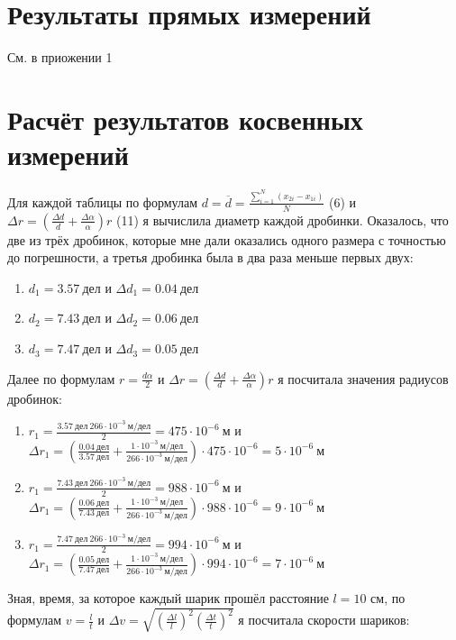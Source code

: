 \documentclass[a4paper]{article}
\begin{document}
\section{Результаты прямых измерений}
См. в приожении 1

\section{Расчёт результатов косвенных измерений}
Для каждой таблицы по формулам $d = \overline{d} = \frac{\sum_{i=1}^N (x_{2i} - x_{1i})}{N}$ (6) и $\Delta r = (\frac{\Delta d}{d} + \frac{\Delta \alpha}{\alpha})r$ (11) я вычислила диаметр каждой дробинки. Оказалось, что две из трёх дробинок, которые мне дали оказались одного размера с точностью до погрешности, а третья дробинка была в два раза меньше первых двух:

\begin{enumerate}
    \item $d_1 = 3.57 \ дел$ и $\Delta d_1 = 0.04 \ дел$ 
    \item $d_2 = 7.43 \ дел$ и $\Delta d_2 = 0.06 \ дел$
    \item $d_3 = 7.47 \ дел$ и $\Delta d_3 = 0.05 \ дел$
\end{enumerate}

Далее по формулам $r = \frac{d \alpha}{2}$ и $\Delta r = (\frac{\Delta d}{d} + \frac{\Delta \alpha}{\alpha})r$ я посчитала значения радиусов дробинок:

\begin{enumerate}
    \item $r_1 = \frac{3.57 \ дел \ 266 \cdot 10^{-3} \ м/дел}{2} = 475 \cdot 10^{-6} \ м$ и $\Delta r_1 = (\frac{0.04 \ дел}{3.57 \ дел} + \frac{1 \cdot 10^{-3} \ м/дел}{266 \cdot 10^{-3} \ м/дел}) \cdot 475 \cdot 10^{-6} = 5 \cdot 10^{-6} \ м$
    \item $r_1 = \frac{7.43 \ дел \ 266 \cdot 10^{-3} \ м/дел}{2} = 988 \cdot 10^{-6} \ м$ и $\Delta r_1 = (\frac{0.06 \ дел}{7.43 \ дел} + \frac{1 \cdot 10^{-3} \ м/дел}{266 \cdot 10^{-3} \ м/дел}) \cdot 988 \cdot 10^{-6} = 9 \cdot 10^{-6} \ м$
    
    \item $r_1 = \frac{7.47 \ дел \ 266 \cdot 10^{-3} \ м/дел}{2} = 994 \cdot 10^{-6} \ м$ и $\Delta r_1 = (\frac{0.05 \ дел}{7.47 \ дел} + \frac{1 \cdot 10^{-3} \ м/дел}{266 \cdot 10^{-3} \ м/дел}) \cdot 994 \cdot 10^{-6} = 7 \cdot 10^{-6} \ м$
\end{enumerate}

Зная, время, за которое каждый шарик прошёл расстояние $l = 10$ см, по формулам $v = \frac{l}{t}$ и $\Delta v =  \sqrt{(\frac{\Delta l}{l})^2 (\frac{\Delta t}{t})^2}$ я посчитала скорости шариков:
\end{document}
